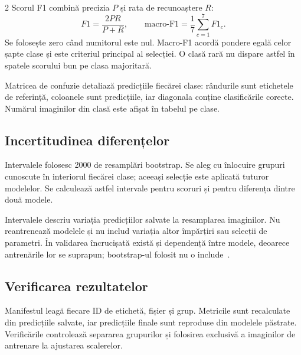 \documentclass[10pt,a4paper]{article}
\begin{document}
\begin{multicols}{2}
Scorul F1 combină precizia $P$ și rata de recunoaștere $R$:
\[
 F1=\frac{2PR}{P+R},\qquad
 \text{macro-F1}=\frac{1}{7}\sum_{c=1}^{7}F1_c.
\]
Se folosește zero când numitorul este nul. Macro-F1 acordă pondere egală
celor șapte clase și este criteriul principal al selecției. O clasă rară
nu dispare astfel în spatele scorului bun pe clasa majoritară.

Matricea de confuzie detaliază predicțiile fiecărei clase: rândurile sunt
etichetele de referință, coloanele sunt predicțiile, iar diagonala conține
clasificările corecte. Numărul imaginilor din clasă este afișat în tabelul pe clase.

\subsection{Incertitudinea diferențelor}
Intervalele folosesc 2000 de resamplări bootstrap. Se aleg cu înlocuire
grupuri cunoscute în interiorul fiecărei clase; aceeași selecție este
aplicată tuturor modelelor. Se calculează astfel intervale pentru scoruri
și pentru diferența dintre două modele.

Intervalele descriu variația predicțiilor salvate la resamplarea imaginilor.
Nu reantrenează modelele și nu includ variația altor împărțiri sau selecții
de parametri. În validarea încrucișată există și dependență între modele,
deoarece antrenările lor se suprapun; bootstrap-ul folosit nu o include~\cite{cv}.

\subsection{Verificarea rezultatelor}
Manifestul leagă fiecare ID de etichetă, fișier și grup. Metricile sunt
recalculate din predicțiile salvate, iar predicțiile finale sunt reproduse
din modelele păstrate. Verificările controlează separarea grupurilor și
folosirea exclusivă a imaginilor de antrenare la ajustarea scalerelor.
\end{multicols}

\newpage
\end{document}
